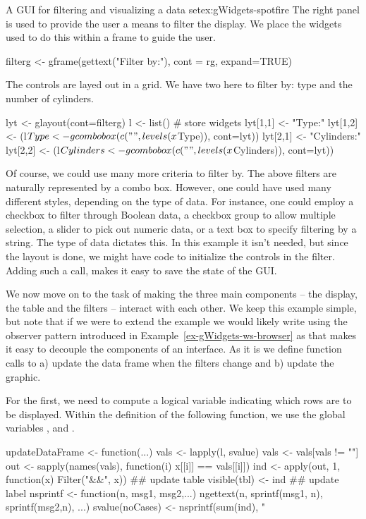 \begin{example}{A GUI for filtering and visualizing a data set}{ex:gWidgets-spotfire}
The right panel is used to provide the user a means to filter the
display. We place the widgets used to do this within a frame to guide
the user.
\begin{Schunk}
\begin{Sinput}
 filterg <- gframe(gettext("Filter by:"), cont = rg, expand=TRUE)
\end{Sinput}
\end{Schunk}
The controls are layed out in a grid. We have two here to filter by:
type and the number of cylinders.
\begin{Schunk}
\begin{Sinput}
 lyt <- glayout(cont=filterg)
 l <- list() # store widgets
 lyt[1,1] <- "Type:"
 lyt[1,2] <- (l$Type <- gcombobox(c("", levels(x$Type)), 
                                  cont=lyt))
 lyt[2,1] <- "Cylinders:"
 lyt[2,2] <- (l$Cylinders <- 
              gcombobox(c("", levels(x$Cylinders)), cont=lyt))
\end{Sinput}
\end{Schunk}
%
Of course, we could use many more criteria to filter by. The above
filters are naturally represented by a combo box. However, one could
have used many different styles, depending on the type of data. For
instance, one could employ a checkbox to filter through Boolean data,
a checkbox group to allow multiple selection, a slider to pick out
numeric data, or a text box to specify filtering by a string. The type
of data dictates this. In this example it isn't needed, but since the
layout is done, we might have code to initialize the controls in the
filter. Adding such a call, makes it easy to save the state of the GUI.

We now move on to the task of making the three main components -- the
display, the table and the filters -- interact with each other. We
keep this example simple, but note that if we were to extend the
example we would likely write using the observer pattern introduced in
Example~\ref{ex-gWidgets-ws-browser} as that makes it easy to decouple
the components of an interface. As it is we define function calls to
a) update the data frame when the filters change and b) update the
graphic.

For the first, we need to compute a logical variable indicating which
rows are to be displayed.  Within the definition of the following function, we
use the global variables ,  and .
\begin{Schunk}
\begin{Sinput}
 updateDataFrame <- function(...) {
   vals <- lapply(l, svalue)
   vals <- vals[vals != ""] 
   out <- sapply(names(vals), function(i) x[[i]] == vals[[i]])
   ind <- apply(out, 1, function(x) Filter("&&", x))
   ## update table
   visible(tbl) <- ind
   ## update label
   nsprintf <- function(n, msg1, msg2,...)
     ngettext(n, sprintf(msg1, n), sprintf(msg2,n), ...)
   svalue(noCases) <- nsprintf(sum(ind), "%
 }
\end{Sinput}
\end{Schunk}


\end{example}
